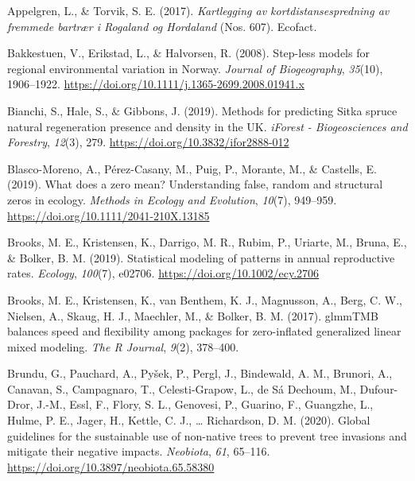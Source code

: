 \documentclass[
]{article}
\begin{document}
\leavevmode\hypertarget{ref-appelgrenKartleggingAvKortdistansespredning2017}{}%
Appelgren, L., \& Torvik, S. E. (2017). \emph{Kartlegging av kortdistansespredning av fremmede bartrær i Rogaland og Hordaland} (Nos. 607). Ecofact.

\leavevmode\hypertarget{ref-bakkestuenSteplessModelsRegional2008}{}%
Bakkestuen, V., Erikstad, L., \& Halvorsen, R. (2008). Step-less models for regional environmental variation in Norway. \emph{Journal of Biogeography}, \emph{35}(10), 1906--1922. \url{https://doi.org/10.1111/j.1365-2699.2008.01941.x}

\leavevmode\hypertarget{ref-bianchiMethodsPredictingSitka2019}{}%
Bianchi, S., Hale, S., \& Gibbons, J. (2019). Methods for predicting Sitka spruce natural regeneration presence and density in the UK. \emph{iForest - Biogeosciences and Forestry}, \emph{12}(3), 279. \url{https://doi.org/10.3832/ifor2888-012}

\leavevmode\hypertarget{ref-blasco-morenoWhatDoesZero2019}{}%
Blasco-Moreno, A., Pérez-Casany, M., Puig, P., Morante, M., \& Castells, E. (2019). What does a zero mean? Understanding false, random and structural zeros in ecology. \emph{Methods in Ecology and Evolution}, \emph{10}(7), 949--959. \url{https://doi.org/10.1111/2041-210X.13185}

\leavevmode\hypertarget{ref-brooksStatisticalModelingPatterns2019}{}%
Brooks, M. E., Kristensen, K., Darrigo, M. R., Rubim, P., Uriarte, M., Bruna, E., \& Bolker, B. M. (2019). Statistical modeling of patterns in annual reproductive rates. \emph{Ecology}, \emph{100}(7), e02706. \url{https://doi.org/10.1002/ecy.2706}

\leavevmode\hypertarget{ref-brooksGlmmTMBBalancesSpeed2017}{}%
Brooks, M. E., Kristensen, K., van Benthem, K. J., Magnusson, A., Berg, C. W., Nielsen, A., Skaug, H. J., Maechler, M., \& Bolker, B. M. (2017). glmmTMB balances speed and flexibility among packages for zero-inflated generalized linear mixed modeling. \emph{The R Journal}, \emph{9}(2), 378--400.

\leavevmode\hypertarget{ref-brunduGlobalGuidelinesSustainable2020}{}%
Brundu, G., Pauchard, A., Pyšek, P., Pergl, J., Bindewald, A. M., Brunori, A., Canavan, S., Campagnaro, T., Celesti-Grapow, L., de Sá Dechoum, M., Dufour-Dror, J.-M., Essl, F., Flory, S. L., Genovesi, P., Guarino, F., Guangzhe, L., Hulme, P. E., Jager, H., Kettle, C. J., \ldots{} Richardson, D. M. (2020). Global guidelines for the sustainable use of non-native trees to prevent tree invasions and mitigate their negative impacts. \emph{Neobiota}, \emph{61}, 65--116. \url{https://doi.org/10.3897/neobiota.65.58380}
\end{document}
